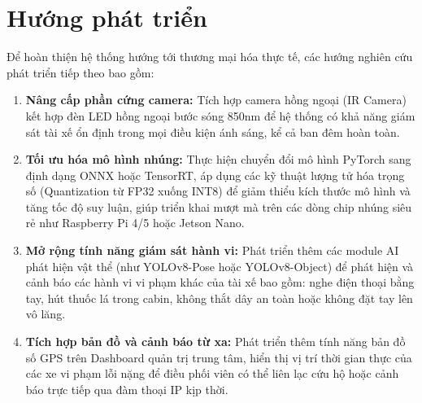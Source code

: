 \documentclass[../DoAn.tex]{subfiles}
\begin{document}
\section{Hướng phát triển}
\label{section:6.2}
Để hoàn thiện hệ thống hướng tới thương mại hóa thực tế, các hướng nghiên cứu phát triển tiếp theo bao gồm:
\begin{enumerate}
    \item \textbf{Nâng cấp phần cứng camera:} Tích hợp camera hồng ngoại (IR Camera) kết hợp đèn LED hồng ngoại bước sóng 850nm để hệ thống có khả năng giám sát tài xế ổn định trong mọi điều kiện ánh sáng, kể cả ban đêm hoàn toàn.
    \item \textbf{Tối ưu hóa mô hình nhúng:} Thực hiện chuyển đổi mô hình PyTorch sang định dạng ONNX hoặc TensorRT, áp dụng các kỹ thuật lượng tử hóa trọng số (Quantization từ FP32 xuống INT8) để giảm thiểu kích thước mô hình và tăng tốc độ suy luận, giúp triển khai mượt mà trên các dòng chip nhúng siêu rẻ như Raspberry Pi 4/5 hoặc Jetson Nano.
    \item \textbf{Mở rộng tính năng giám sát hành vi:} Phát triển thêm các module AI phát hiện vật thể (như YOLOv8-Pose hoặc YOLOv8-Object) để phát hiện và cảnh báo các hành vi vi phạm khác của tài xế bao gồm: nghe điện thoại bằng tay, hút thuốc lá trong cabin, không thắt dây an toàn hoặc không đặt tay lên vô lăng.
    \item \textbf{Tích hợp bản đồ và cảnh báo từ xa:} Phát triển thêm tính năng bản đồ số GPS trên Dashboard quản trị trung tâm, hiển thị vị trí thời gian thực của các xe vi phạm lỗi nặng để điều phối viên có thể liên lạc cứu hộ hoặc cảnh báo trực tiếp qua đàm thoại IP kịp thời.
\end{enumerate}
\end{document}
